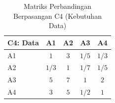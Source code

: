 \begin{table}[H]
	\centering
	\caption{Matriks Perbandingan Berpasangan C4 (Kebutuhan Data)}
	\label{tab:perbandingan_c4}
	\begin{tabular}{|l|c|c|c|c|}
		\hline
		C4: Data & A1 & A2 & A3 & A4 \\ \hline
		A1 & $1$ & $3$ & $1/5$ & $1/3$ \\ \hline
		A2 & $1/3$ & $1$ & $1/7$ & $1/5$ \\ \hline
		A3 & $5$ & $7$ & $1$ & $2$ \\ \hline
		A4 & $3$ & $5$ & $1/2$ & $1$ \\ \hline
	\end{tabular}
\end{table}